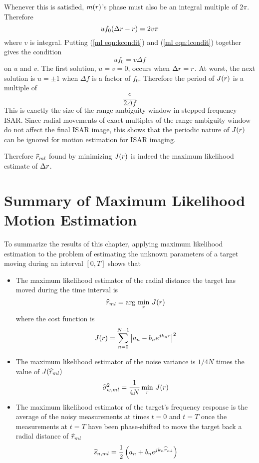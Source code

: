 Whenever this is satisfied, $m({r})$'s phase must also be an integral multiple
of $2\pi$.  Therefore
\begin{equation}\label{ml eqn:lcondit}
uf_0({\Delta r}-{r})=2v\pi
\end{equation}
where $v$ is integral.  Putting (\ref{ml eqn:kcondit}) and (\ref{ml eqn:lcondit}) 
together gives the condition
\begin{equation}
uf_0=v\Delta f
\end{equation}
on $u$ and $v$.  The first solution, $u=v=0$, occurs when ${\Delta r}={r}$.
At worst, the next solution is $u=\pm 1$ when $\Delta f$ is a factor of
$f_0$.  Therefore the period of $J({r})$ is a multiple of
$$\frac{c}{2\Delta f}$$
This is exactly the size of the range ambiguity window in stepped-frequency
ISAR.  Since radial movements of exact multiples of the range ambiguity
window do not affect the final ISAR image, this shows that the 
periodic nature of $J({r})$ can be ignored for motion estimation for 
ISAR imaging.

Therefore $\widehat{r}_{ml}$ found by minimizing $J({r})$ is indeed the maximum
likelihood estimate of ${\Delta r}$.

\section{Summary of Maximum Likelihood Motion Estimation}

To summarize the results of this chapter, applying maximum likelihood 
estimation to the problem of estimating the unknown parameters of a 
target moving during an interval $[0,T]$ shows that
\begin{itemize}
\item The maximum likelihood estimator of the radial distance the target
has moved during the time interval is 
$$\widehat{r}_{ml}=\arg\,\min_{{r}}\,J({r})$$
where the cost function is
$$J({r})=\sum_{n=0}^{N-1} \left|a_n-b_n{e^{jk_n{r}}}\right|^2$$
\item The maximum likelihood estimator of the noise variance is $1/4N$ 
times the value of $J(\widehat{r}_{ml})$
$$\widehat{\sigma}^2_{{w},ml}=\frac{1}{4N}\min_{{r}}\,J({r})$$
\item The maximum likelihood estimator of the target's frequency response is
the average of the noisy measurements at times $t=0$ and $t=T$ once the 
measurements at $t=T$ have been phase-shifted to move the target back a 
radial distance of $\widehat{r}_{ml}$
$$\widehat{s}_{n,ml}=\frac{1}{2}\left(a_n+b_n{e^{jk_n\widehat{r}_{ml}}}\right)$$
\end{itemize}
